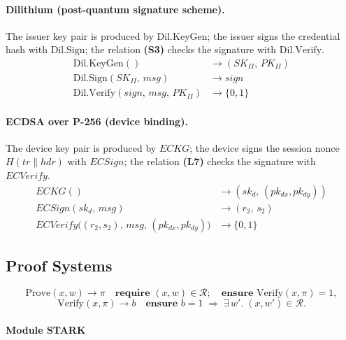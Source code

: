 \documentclass[binding=0.6cm,oneside,noexaminfo]{sapthesis}
\newcommand{\concat}{\mathbin{\|}}
\newcommand{\DilKG}{\mathrm{Dil.KeyGen}}
\newcommand{\DilSign}{\mathrm{Dil.Sign}}
\newcommand{\DilVerify}{\mathrm{Dil.Verify}}
\begin{document}
\paragraph{Dilithium (post-quantum signature scheme).}
The issuer key pair is produced by $\DilKG$; the issuer signs the credential
hash with $\DilSign$; the relation \textbf{(S3)} checks the signature with
$\DilVerify$.
\begin{align*}
\DilKG()                         &\to (SK_{II},\, PK_{II}) \\
\DilSign(SK_{II},\, msg)         &\to sign \\
\DilVerify(sign,\, msg,\, PK_{II}) &\to \{0,1\}
\end{align*}

\paragraph{ECDSA over P-256 (device binding).}
The device key pair is produced by $ECKG$; the device signs the session
nonce $H(tr \concat hdr)$ with $ECSign$; the relation \textbf{(L7)} checks the
signature with $ECVerify$.
\begin{align*}
ECKG()                                                       &\to (sk_d,\, (pk_{dx}, pk_{dy})) \\
ECSign(sk_d,\, msg)                                          &\to (r_2,\, s_2) \\
ECVerify\!\bigl((r_2, s_2),\, msg,\, (pk_{dx}, pk_{dy})\bigr) &\to \{0,1\}
\end{align*}

\subsection{Proof Systems}
\label{sec:proof-systems}

\[
  \mathrm{Prove}(x, w) \to \pi
  \quad\textbf{require } (x,w)\in\mathcal{R};\quad
  \textbf{ensure } \mathrm{Verify}(x,\pi)=1,
\]
\[
  \mathrm{Verify}(x, \pi) \to b
  \quad\textbf{ensure } b=1 \;\Rightarrow\; \exists\, w'.\; (x,w')\in\mathcal{R}.
\]

\paragraph{Module \textsf{STARK}}
\label{sec:stark}
\end{document}
